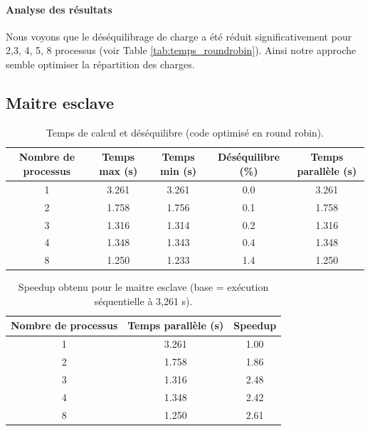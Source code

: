 \documentclass[a4paper,13pt]{book}
\begin{document}
\paragraph{Analyse des résultats}
Nous voyons que le déséquilibrage de charge a été réduit significativement pour 2,3, 4, 5, 8 processus (voir Table \ref{tab:temps_roundrobin}). Ainsi notre approche semble optimiser la répartition des charges.
\clearpage
\subsection{Maitre esclave}

\begin{table}[ht]
  \centering
  \caption{Temps de calcul et déséquilibre (code optimisé en round robin).}
  \label{tab:temps_slave}
  \begin{tabular}{@{}ccccc@{}}
    \toprule
  \textbf{Nombre de processus} & \textbf{Temps max (s)} & \textbf{Temps min (s)} & \textbf{Déséquilibre (\%)} & \textbf{Temps parallèle (s)} \\
  \midrule
  1 & 3.261 & 3.261 & 0.0 & 3.261 \\
  2 & 1.758 & 1.756 & 0.1 & 1.758 \\
  3 & 1.316 & 1.314 & 0.2 & 1.316 \\
  4 & 1.348 & 1.343 & 0.4 & 1.348 \\
  8 & 1.250 & 1.233 & 1.4 & 1.250 \\
  \bottomrule
  \end{tabular}
  \end{table}
  
  \begin{table}[ht]
  \centering
  \caption{Speedup obtenu pour le maitre esclave (base = exécution séquentielle à 3,261 s).}
  \label{tab:speedup_slave}
  \begin{tabular}{@{}ccc@{}}
    \toprule
  \textbf{Nombre de processus} & \textbf{Temps parallèle (s)} & \textbf{Speedup} \\
  \midrule
  1 & 3.261 & 1.00 \\
  2 & 1.758 & 1.86 \\
  3 & 1.316 & 2.48 \\
  4 & 1.348 & 2.42 \\
  8 & 1.250 & 2.61 \\
  \bottomrule
  \end{tabular}
  \end{table}
  
\end{document}
